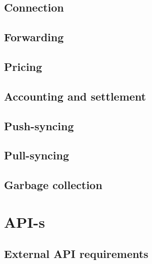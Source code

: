 \section{Connection  \statusorange}\label{spec:strategy:connection}
%

\section{Forwarding  \statusorange}\label{spec:strategy:forwarding}


\section{Pricing  \statusorange}\label{spec:strategy:pricing}


\section{Accounting and settlement  \statusorange}\label{spec:strategy:swap}


\section{Push-syncing  \statusorange}\label{spec:strategy:push-sync}


\section{Pull-syncing  \statusorange}\label{spec:strategy:pull-sync}


\section{Garbage collection \statusorange}\label{spec:strategy:garbage-collection}


\chapter{API-s}\label{spec:api}

\section{External API requirements\statusorange}\label{spec:api:external}
